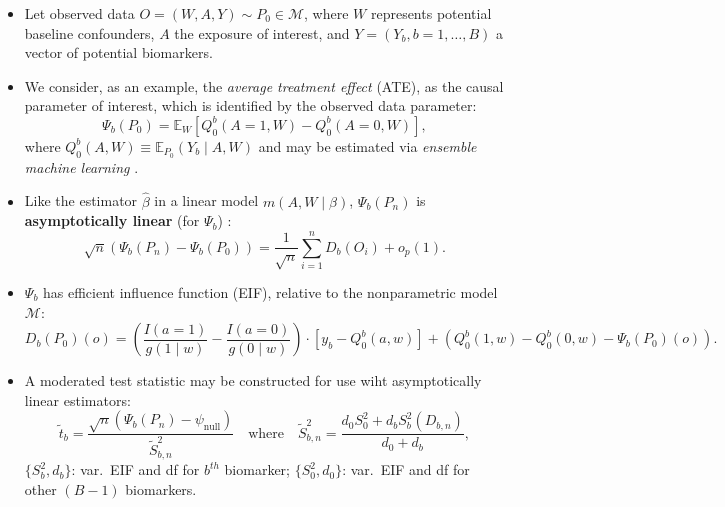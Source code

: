 \documentclass[landscape,a0paper,fontscale=0.285]{baposter} %
\newcommand{\compresslist}{ %
\setlength{\itemsep}{1pt}
\setlength{\parskip}{0pt}
\setlength{\parsep}{0pt}
}
\newcommand{\E}{\mathbb{E}}
\newcommand{\M}{\mathcal{M}}
\newcommand{\1}{\mathbbm{1}}
\begin{document}
\begin{poster}
{\begin{itemize}
  \itemsep0.50pt
  \item Let observed data $O = (W, A, Y) \sim P_0 \in \M$, where $W$ represents
      potential baseline confounders, $A$ the exposure of interest, and
      $Y = ({Y_b}, b = 1, \dots, B)$ a vector of potential biomarkers.
  \item We consider, as an example, the \textit{average treatment effect} (ATE),
      as the causal parameter of interest, which is identified by the observed
      data parameter:
      \begin{equation}\label{ate}
        \Psi_b(P_0) = \E_W[ Q_0^b(A = 1, W) - Q_0^b(A = 0, W)],
      \end{equation}
        where $Q_0^b(A, W) \equiv \E_{P_0}(Y_b \mid A, W)$ and may be estimated
        via \textit{ensemble machine learning}
        \cite{vdl2007super,breiman1996stacked,wolpert1992stacked}.
  \item Like the estimator $\hat{\beta}$ in a linear model $m(A,W \mid \beta)$,
      $\Psi_b(P_n)$ is \textbf{asymptotically linear} (for $\Psi_b$)
      \cite{vdl2011targeted}:
      \begin{equation}\label{asymp_lin}
        \sqrt{n} (\Psi_b(P_n) - \Psi_b(P_0)) = \frac{1}{\sqrt{n}} \sum_{i=1}^n
        D_b(O_i) + o_p(1).
      \end{equation}
  \item $\Psi_b$ has efficient influence function (EIF), relative to the
      nonparametric model $\M$:
      \begin{equation}\label{eif_ate}
        D_b(P_0)(o) = \left(\frac{I(a = 1)}{g(1 \mid w)} -
        \frac{I(a = 0)}{g(0 \mid w)}\right) \cdot \left[y_b - Q_0^b(a, w)\right]
        + \left(Q_0^b(1, w) - Q_0^b(0, w) - \Psi_b(P_0)(o)\right).
      \end{equation}
  \item A moderated test statistic \cite{smyth2004linear,hejazi2018+supervised}
      may be constructed for use wiht asymptotically linear estimators:
      \begin{equation}\label{mod_eif}
        \widetilde{t}_b = \frac{\sqrt{n}(\Psi_b(P_n) -
          \psi_{\text{null}})}{\widetilde{S}_{b,n}^2}
        \quad \text{where} \quad
        \widetilde{S}_{b,n}^2 = \frac{d_0S_0^2 + d_bS_b^2(D_{b,n})}{d_0 + d_b},
      \end{equation}
    $\{S_b^2, d_b\}$: var.~EIF and df for $b^{th}$ biomarker;
    $\{S_0^2, d_0\}$: var.~EIF and df for other $(B-1)$ biomarkers.
\end{itemize}

}


\end{poster}
\end{document}
